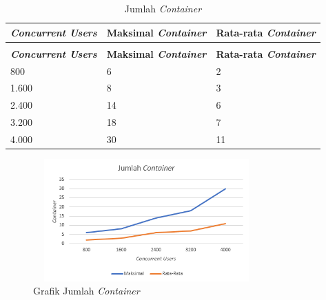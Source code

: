         \begin{longtable}{|p{}|p{}|p{}|}
        \caption{Jumlah \textit{Container}} \label{tjumlahcontainer} \\
            \hline
            \textbf{\textit{Concurrent Users}} & \textbf{Maksimal \textit{Container}} &  \textbf{Rata-rata \textit{Container}} \\ \hline
            \endfirsthead
            \caption[]{Jumlah \textit{Container}} \\
            \hline
            \textbf{\textit{Concurrent Users}} & \textbf{Maksimal \textit{Container}} &  \textbf{Rata-rata \textit{Container}} \\ \hline
            \endhead
            \endfoot
            \endlastfoot
            
            800 & 6 & 2 \\ \hline
            1.600 & 8 & 3 \\ \hline
            2.400 & 14 & 6 \\ \hline
            3.200 & 18 & 7 \\ \hline
            4.000 & 30 & 11 \\ \hline
					
		\end{longtable}
        
        \begin{figure}[H]
				\centering
				\includegraphics[width=8.7cm,height=4.7cm]{Images/C-5/jumlahcontainer.png}
				\caption{Grafik Jumlah \textit{Container}}
				\label{gjumlahcontainer}
			\end{figure}
        
